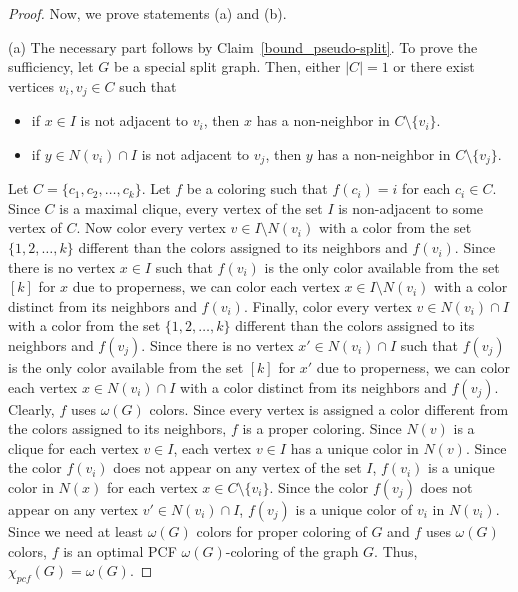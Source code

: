 \documentclass[11pt]{article}
\theoremstyle{plain}
\begin{document}
\begin{proof}
	Now, we prove statements (a) and (b).
	
	\medskip
	
	(a) The necessary part follows by Claim~\ref{bound_pseudo-split}. To prove the sufficiency, let $G$ be a special split graph. Then, either $|C| = 1$ or there exist vertices $v_i, v_j \in C$ such that 
	\begin{itemize}
		\item if $x\in I$ is not adjacent to $v_i$, then $x$ has a non-neighbor in $C\setminus\{v_i\}$.
		\item if $y\in N(v_i)\cap I$ is not adjacent to $v_j$, then $y$ has a non-neighbor in $C\setminus\{v_j\}$.
	\end{itemize}
	
	Let $C = \{c_1, c_2, \ldots, c_k\}$.
	Let $f$ be a coloring such that $f(c_i) = i$ for each $c_i \in C$. Since $C$ is a maximal clique, every vertex of the set $I$ is non-adjacent to some vertex of $C$. Now color every vertex $v\in I\setminus N(v_i)$ with a color from the set $\{1, 2, \ldots, k\}$ different than the colors assigned to its neighbors and $f(v_i)$. Since there is no vertex $x\in I$ such that $f(v_i)$ is the only color available from the set $[k]$ for $x$ due to properness, we can color each vertex $x\in I\setminus N(v_i)$ with a color distinct from its neighbors and $f(v_i)$. 
	Finally, color every vertex $v\in N(v_i)\cap I$ with a color from the set $\{1, 2, \ldots, k\}$ different than the colors assigned to its neighbors and $f(v_j)$. Since there is no vertex $x'\in N(v_i)\cap I$ such that $f(v_j)$ is the only color available from the set $[k]$ for $x'$ due to properness, we can color each vertex $x\in N(v_i)\cap I$ with a color distinct from its neighbors and $f(v_j)$. 
	Clearly, $f$ uses $\omega(G)$ colors. Since every vertex is assigned a color different from the colors assigned to its neighbors, $f$ is a proper coloring. Since $N(v)$ is a clique for each vertex $v\in I$, each vertex $v\in I$ has a unique color in $N(v)$. Since the color $f(v_i)$ does not appear on any vertex of the set $I$, $f(v_i)$ is a unique color in $N(x)$ for each vertex $x\in C\setminus\{v_i\}$. Since the color $f(v_j)$ does not appear on any vertex $v'\in N(v_i)\cap I$, $f(v_j)$ is a unique color of $v_i$ in $N(v_i)$. Since we need at least $\omega(G)$ colors for proper coloring of $G$ and $f$ uses $\omega(G)$ colors, $f$ is an optimal PCF $\omega(G)$-coloring of the graph $G$. Thus, $\chi_{pcf}(G) = \omega(G)$.
	
	\medskip
	

\end{proof}
\end{document}
